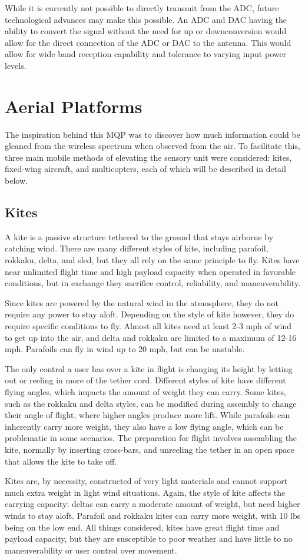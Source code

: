 While it is currently not possible to directly transmit from the ADC, future technological advances may make this possible. An ADC and DAC having the ability to convert the signal without the need for up or downconversion would allow for the direct connection of the ADC or DAC to the antenna. This would allow for wide band reception capability and tolerance to varying input power levels.

\section{Aerial Platforms}
The inspiration behind this MQP was to discover how much information could be gleaned from the wireless spectrum when observed from the air. To facilitate this, three main mobile methods of elevating the sensory unit were considered: kites, fixed-wing aircraft, and multicopters, each of which will be described in detail below.

\subsection{Kites}
A kite is a passive structure tethered to the ground that stays airborne by catching wind. There are many different styles of kite, including parafoil, rokkaku, delta, and sled, but they all rely on the same principle to fly.\cite{kite_iqp} Kites have near unlimited flight time and high payload capacity when operated in favorable conditions, but in exchange they sacrifice control, reliability, and maneuverability.\par
Since kites are powered by the natural wind in the atmosphere, they do not require any power to stay aloft. Depending on the style of kite however, they do require specific conditions to fly. Almost all kites need at least 2-3 mph of wind to get up into the air, and delta and rokkaku are limited to a maximum of 12-16 mph.\cite{kite_iqp} Parafoils can fly in wind up to 20 mph, but can be unstable\cite{kite_iqp}.\par
The only control a user has over a kite in flight is changing its height by letting out or reeling in more of the tether cord. Different styles of kite have different flying angles, which impacts the amount of weight they can carry. Some kites, such as the rokkaku and delta styles, can be modified during assembly to change their angle of flight, where higher angles produce more lift. While parafoils can inherently carry more weight, they also have a low flying angle, which can be problematic in some scenarios. The preparation for flight involves assembling the kite, normally by inserting cross-bars, and unreeling the tether in an open space that allows the kite to take off.\par
Kites are, by necessity, constructed of very light materials and cannot support much extra weight in light wind situations. Again, the style of kite affects the carrying capacity: deltas can carry a moderate amount of weight, but need higher winds to stay aloft. Parafoil and rokkaku kites can carry more weight, with 10 lbs being on the low end. All things considered, kites have great flight time and payload capacity, but they are susceptible to poor weather and have little to no maneuverability or user control over movement.

